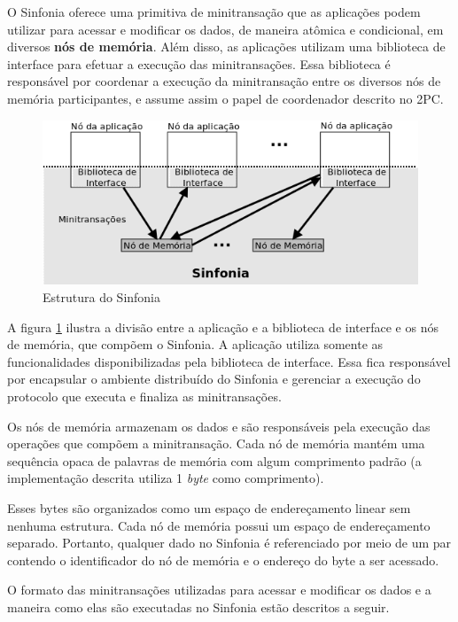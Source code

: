 \documentclass[11pt,twoside,a4paper]{book}
\begin{document}
O Sinfonia oferece uma primitiva de minitransação que as aplicações podem utilizar para acessar e modificar os dados, de maneira atômica e condicional, em diversos \textbf{nós de memória}. Além disso, as aplicações utilizam uma biblioteca de interface para efetuar a execução das minitransações. Essa biblioteca é responsável por coordenar a execução da minitransação entre os diversos nós de memória participantes, e assume assim o papel de coordenador descrito no 2PC.

\begin{figure}
  \centering
  \includegraphics[width=\textwidth]{sinfonia} 
  \caption{Estrutura do Sinfonia}
  \label{fig:sinfonia} 
\end{figure}

A figura \ref{fig:sinfonia} ilustra a divisão entre a aplicação e a biblioteca de interface e os nós de memória, que compõem o Sinfonia. A aplicação utiliza somente as funcionalidades disponibilizadas pela biblioteca de interface. Essa fica responsável por encapsular o ambiente distribuído do Sinfonia e gerenciar a execução do protocolo que executa e finaliza as minitransações.

Os nós de memória armazenam os dados e são responsáveis pela execução das operações que compõem a minitransação. Cada nó de memória mantém uma sequência opaca de palavras de memória com algum comprimento padrão (a implementação descrita utiliza 1 \emph{byte} como comprimento). 

Esses bytes são organizados como um espaço de endereçamento linear sem nenhuma estrutura. Cada nó de memória possui um espaço de endereçamento separado. Portanto, qualquer dado no Sinfonia é referenciado por meio de um par contendo o identificador do nó de memória e o endereço do byte a ser acessado.

O formato das minitransações utilizadas para acessar e modificar os dados e a maneira como elas são executadas no Sinfonia estão descritos a seguir.
\end{document}
